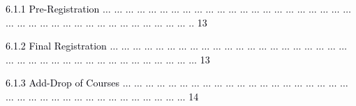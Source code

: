 \documentclass[12pt]{article}
\begin{document}
\vspace{\baselineskip}
\begin{adjustwidth}{0.5in}{0.0in}
{\fontsize{7pt}{8.4pt}\selectfont \textcolor[HTML]{00000A}{6.1.1 Pre-Registration $ \ldots $ $ \ldots $ $ \ldots $ $ \ldots $ $ \ldots $ $ \ldots $ $ \ldots $ $ \ldots $ $ \ldots $ $ \ldots $ $ \ldots $ $ \ldots $ $ \ldots $ $ \ldots $ $ \ldots $ $ \ldots $ $ \ldots $ $ \ldots $ $ \ldots $ $ \ldots $ $ \ldots $ $ \ldots $ $ \ldots $ $ \ldots $ $ \ldots $ $ \ldots $ $ \ldots $ $ \ldots $ $ \ldots $ $ \ldots $ $ \ldots $ $ \ldots $ $ \ldots $ $ \ldots $ $ \ldots $ $ \ldots $ $ \ldots $ $ \ldots $ .. 13}\par}\par

\end{adjustwidth}


\vspace{\baselineskip}
\begin{adjustwidth}{0.5in}{0.0in}
{\fontsize{7pt}{8.4pt}\selectfont \textcolor[HTML]{00000A}{6.1.2 Final Registration $ \ldots $ $ \ldots $ $ \ldots $ $ \ldots $ $ \ldots $ $ \ldots $ $ \ldots $ $ \ldots $ $ \ldots $ $ \ldots $ $ \ldots $ $ \ldots $ $ \ldots $ $ \ldots $ $ \ldots $ $ \ldots $ $ \ldots $ $ \ldots $ $ \ldots $ $ \ldots $ $ \ldots $ $ \ldots $ $ \ldots $ $ \ldots $ $ \ldots $ $ \ldots $ $ \ldots $ $ \ldots $ $ \ldots $ $ \ldots $ $ \ldots $ $ \ldots $ $ \ldots $ $ \ldots $ $ \ldots $ $ \ldots $ $ \ldots $ $ \ldots $  13}\par}\par

\end{adjustwidth}


\vspace{\baselineskip}
\begin{adjustwidth}{0.5in}{0.0in}
{\fontsize{7pt}{8.4pt}\selectfont \textcolor[HTML]{00000A}{6.1.3 Add-Drop of Courses $ \ldots $ $ \ldots $ $ \ldots $ $ \ldots $ $ \ldots $ $ \ldots $ $ \ldots $ $ \ldots $ $ \ldots $ $ \ldots $ $ \ldots $ $ \ldots $ $ \ldots $ $ \ldots $ $ \ldots $ $ \ldots $ $ \ldots $ $ \ldots $ $ \ldots $ $ \ldots $ $ \ldots $ $ \ldots $ $ \ldots $ $ \ldots $ $ \ldots $ $ \ldots $ $ \ldots $ $ \ldots $ $ \ldots $ $ \ldots $ $ \ldots $ $ \ldots $ $ \ldots $ $ \ldots $ $ \ldots $ $ \ldots $  14}\par}\par

\end{adjustwidth}
\end{document}
